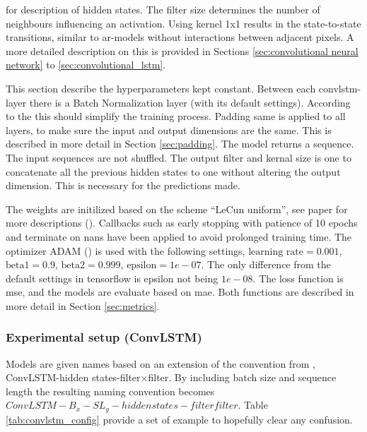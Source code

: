 for description of hidden states. 
The filter size determines the number of neighbours influencing an activation. Using kernel 1x1 results in the state-to-state transitions, similar to \acrshort{ar}-models without interactions between adjacent pixels. A more detailed description on this is provided in Sections \ref{sec:convolutional neural network} to \ref{sec:convolutional_lstm}. 

This section describe the hyperparameters kept constant. Between each \acrshort{convlstm}-layer there is a Batch Normalization layer (with its default settings). According to the  this should simplify the training process. Padding same is applied to all layers, to make sure the input and output dimensions are the same. This is described in more detail in Section \ref{sec:padding}. The model returns a sequence. The input sequences are not shuffled. The output filter and kernal size is one to concatenate all the previous hidden states to one without altering the output dimension. This is necessary for the predictions made.

The weights are initilized based on the scheme ``LeCun uniform'', see paper for more descriptions (\cite{Lecun98efficientbackprop}). Callbacks such as early stopping with patience of 10 epochs and terminate on nans have been applied to avoid prolonged training time. The optimizer ADAM (\cite{Kingma2015Adam:Optimization}) is used with the following settings, $\text{learning rate}=0.001$, $\text{beta1}=0.9$, $\text{beta2}=0.999$, $\text{epsilon}=1e-07$. The only difference from the default settings in tensorflow is epsilon not being $1e-08$. The loss function is \acrfull{mse}, and the models are evaluate based on \acrfull{mae}.
Both functions are described in more detail in Section \ref{sec:metrics}. %

\subsubsection{Experimental setup (ConvLSTM)}
Models are given names based on an extension of the convention from , ConvLSTM-hidden states-filter$\times$filter. 
By including batch size and sequence length the resulting naming convention becomes \newline $ConvLSTM-B_{x}-SL_{y}-hidden states-filter$\times$filter$. Table \ref{tab:convlstm_config} provide a set of example to hopefully clear any confusion.


